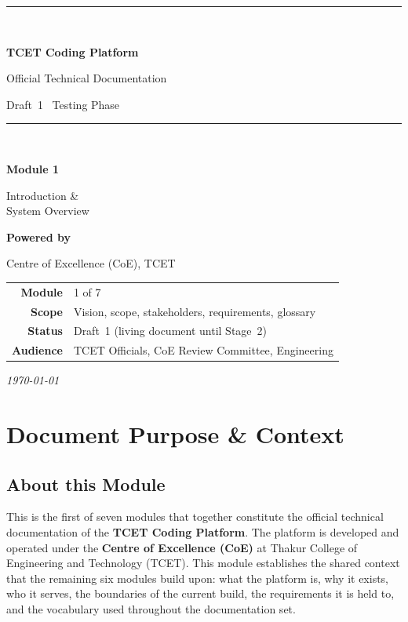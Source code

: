 \documentclass[12pt,a4paper,oneside]{report}
\begin{document}
\begin{titlepage}
\centering
\vspace*{1.4cm}
{\color{tcetaccent}\rule{\linewidth}{1.2pt}}\\[0.5cm]
{\LARGE\bfseries TCET Coding Platform\par}
\vspace{0.4cm}
{\Large Official Technical Documentation\par}
{\large Draft~1 \textemdash\ Testing Phase\par}
{\color{tcetaccent}\rule{\linewidth}{1.2pt}}\\[1.4cm]
{\Huge\bfseries\color{tcetblue} Module 1\par}
\vspace{0.3cm}
{\Huge Introduction \&\\[0.2cm] System Overview\par}
\vspace{2.2cm}
{\large\bfseries Powered by\par}
{\Large\color{tcetblue} Centre of Excellence (CoE), TCET\par}
\vfill
\begin{tabular}{rl}
\textbf{Module} & 1 of 7\\[3pt]
\textbf{Scope} & Vision, scope, stakeholders, requirements, glossary\\[3pt]
\textbf{Status} & Draft~1 (living document until Stage~2)\\[3pt]
\textbf{Audience} & TCET Officials, CoE Review Committee, Engineering\\
\end{tabular}
\vspace{0.8cm}
{\small\itshape \today\par}
\end{titlepage}

\tableofcontents
\clearpage
{}

\chapter{Document Purpose \& Context}

\section{About this Module}
This is the first of seven modules that together constitute the official
technical documentation of the \textbf{TCET Coding Platform}. The platform is
developed and operated under
the \textbf{Centre of Excellence (CoE)} at Thakur College of Engineering and
Technology (TCET). This module establishes the shared context that the remaining
six modules build upon: what the platform is, why it exists, who it serves, the
boundaries of the current build, the requirements it is held to, and the
vocabulary used throughout the documentation set.
\end{document}
